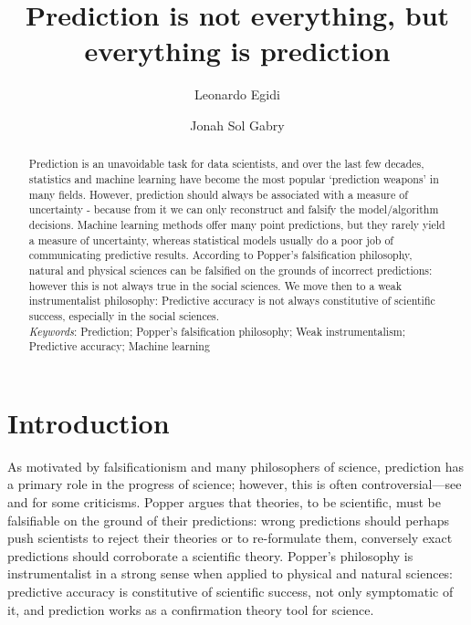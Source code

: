 \documentclass{statsoc}
\title[]{Prediction is not everything, but everything is prediction}
\author[Egidi and Gabry]{Leonardo Egidi}
\author[Egidi and Gabry]{Jonah Sol Gabry}
\begin{document}
\maketitle

\begin{abstract}
Prediction is an unavoidable task for data scientists, and over the last few decades, statistics and machine learning have become the most popular `prediction weapons' in many fields. However, prediction should always be associated with a measure of uncertainty - because from it  we can only reconstruct and 
falsify the model/algorithm decisions. Machine learning methods offer many point predictions,  but they rarely yield a measure of uncertainty, whereas statistical 
models usually do a poor job of communicating predictive results.
According to Popper’s falsification philosophy, natural and physical sciences can be falsified on the grounds of incorrect predictions: however  this is not always true in the social sciences.
We move then to a weak instrumentalist philosophy: Predictive accuracy is not always constitutive of scientific success, especially in the social sciences.\\

\emph{Keywords}: Prediction; Popper’s falsification philosophy; Weak instrumentalism; Predictive accuracy; Machine learning

\end{abstract}

\section{Introduction}

As motivated by falsificationism
\citep{popper1934logic} and many philosophers of science, prediction has a primary role in the progress of science; however, this is often controversial---see \cite{kuhn1962structure} and \cite{lakatos1976falsification} for some criticisms. Popper argues 
that theories, to be scientific, must be falsifiable on the ground of their  predictions: wrong predictions should perhaps push scientists to reject their theories or to 
re-formulate them, conversely exact predictions should corroborate a scientific theory. Popper's philosophy is instrumentalist 
in a strong sense \citep{hitchcock2004prediction} when applied to physical and natural sciences: predictive accuracy is constitutive of scientific success, not only symptomatic of it, and  prediction works as a confirmation theory tool for science.   
\end{document}
